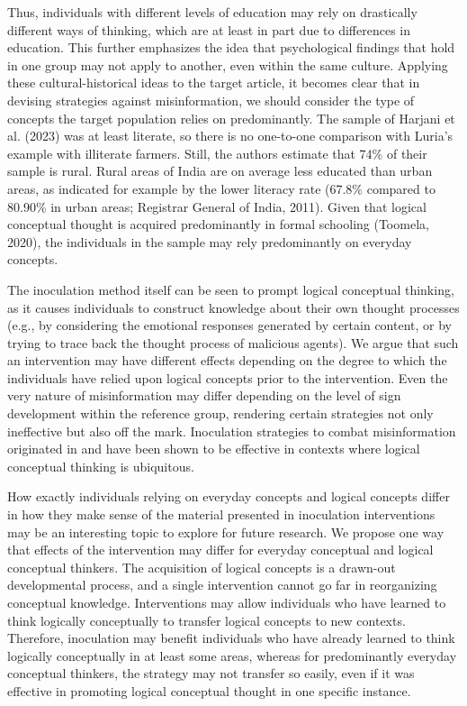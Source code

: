 \documentclass[authordate, reflection, issue]{jote-new-article}
\begin{document}
	Thus, individuals with different levels of education may rely on drastically different ways of thinking, which are at least in part due to differences in education. This further emphasizes the idea that psychological findings that hold in one group may not apply to another, even within the same culture. Applying these cultural-historical ideas to the target article, it becomes clear that in devising strategies against misinformation, we should consider the type of concepts the target population relies on predominantly. The sample of Harjani et al. (2023) was at least literate, so there is no one-to-one comparison with Luria's example with illiterate farmers. Still, the authors estimate that 74\% of their sample is rural. Rural areas of India are on average less educated than urban areas, as indicated for example by the lower literacy rate (67.8\% compared to 80.90\% in urban areas; Registrar General of India, 2011). Given that logical conceptual thought is acquired predominantly in formal schooling (Toomela, 2020), the individuals in the sample may rely predominantly on everyday concepts.



	The inoculation method itself can be seen to prompt logical conceptual thinking, as it causes individuals to construct knowledge about their own thought processes (e.g., by considering the emotional responses generated by certain content, or by trying to trace back the thought process of malicious agents). We argue that such an intervention may have different effects depending on the degree to which the individuals have relied upon logical concepts prior to the intervention. Even the very nature of misinformation may differ depending on the level of sign development within the reference group, rendering certain strategies not only ineffective but also off the mark. Inoculation strategies to combat misinformation originated in and have been shown to be effective in contexts where logical conceptual thinking is ubiquitous.



	How exactly individuals relying on everyday concepts and logical concepts differ in how they make sense of the material presented in inoculation interventions may be an interesting topic to explore for future research. We propose one way that effects of the intervention may differ for everyday conceptual and logical conceptual thinkers. The acquisition of logical concepts is a drawn-out developmental process, and a single intervention cannot go far in reorganizing conceptual knowledge. Interventions may allow individuals who have learned to think logically conceptually to transfer logical concepts to new contexts. Therefore, inoculation may benefit individuals who have already learned to think logically conceptually in at least some areas, whereas for predominantly everyday conceptual thinkers, the strategy may not transfer so easily, even if it was effective in promoting logical conceptual thought in one specific instance.
\end{document}
